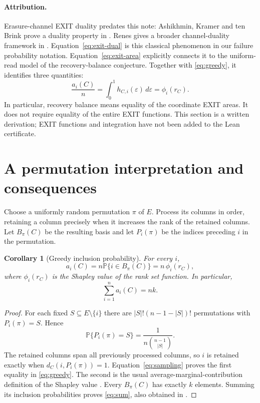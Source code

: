\documentclass[11pt]{article}
\newtheorem{corollary}[theorem]{Corollary}
\theoremstyle{remark}
\newcommand{\Prob}{\mathbb P}
\begin{document}
\paragraph{Attribution.}
Erasure-channel EXIT duality predates this note: Ashikhmin, Kramer and
ten Brink prove a duality property in \cite[Section IV-E, Theorem 4]{AKB}.
Renes gives a broader channel-duality framework in
\cite[Section 4.5, Theorem 4 and its coordinatewise proof]{Renes}.
Equation~\eqref{eq:exit-dual} is this classical phenomenon in our failure
probability notation.
Equation~\eqref{eq:exit-area} explicitly connects it to the uniform-read
model of the recovery-balance conjecture. Together with
\eqref{eq:greedy}, it identifies three quantities:
\[
 \frac{a_i(C)}n
   =\int_0^1 h_{C,i}(\varepsilon)\,d\varepsilon
   =\phi_i(r_C).
\]
In particular, recovery balance means equality of the coordinate EXIT
areas. It does not require equality of the entire EXIT functions.
This section is a written derivation; EXIT functions and integration have
not been added to the Lean certificate.

\section{A permutation interpretation and consequences}
Choose a uniformly random permutation $\pi$ of $E$. Process its columns in
order, retaining a column precisely when it increases the rank of the
retained columns. Let $B_\pi(C)$ be the resulting basis and let $P_i(\pi)$
be the indices preceding $i$ in the permutation.

\begin{corollary}[Greedy inclusion probability]\label{cor:greedy}
For every $i$,
\begin{equation}\label{eq:greedy}
 a_i(C)=n\Prob\{i\in B_\pi(C)\}
       =n\,\phi_i(r_C),
\end{equation}
where $\phi_i(r_C)$ is the Shapley value of the rank set function.
In particular,
\begin{equation}\label{eq:sum}
                     \sum_{i=1}^n a_i(C)=nk.
\end{equation}
\end{corollary}
\begin{proof}
For each fixed $S\subseteq E\setminus\{i\}$ there are
$|S|!(n-1-|S|)!$ permutations with $P_i(\pi)=S$. Hence
\[
 \Prob\{P_i(\pi)=S\}=\frac1{n\binom{n-1}{|S|}}.
\]
The retained columns span all previously processed columns, so $i$ is
retained exactly when $d_C(i,P_i(\pi))=1$. Equation~\eqref{eq:sampling}
proves the first equality in \eqref{eq:greedy}. The second is the usual
average-marginal-contribution definition of the Shapley value \cite{Shapley}.
Every $B_\pi(C)$ has exactly $k$ elements. Summing its inclusion
probabilities proves \eqref{eq:sum}, also obtained in \cite{GBRY}.
\end{proof}
\end{document}
